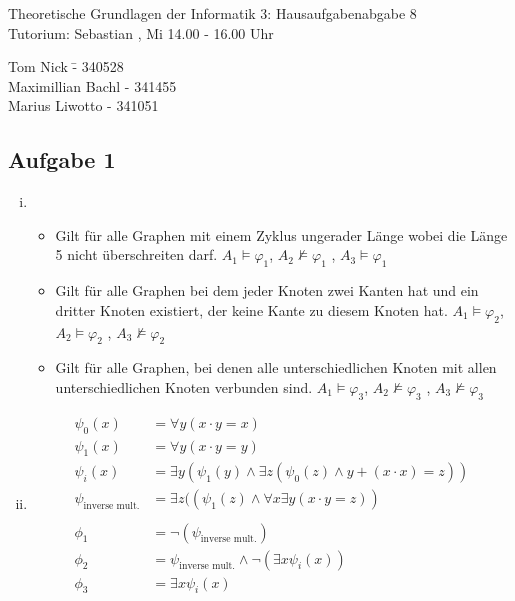 \documentclass[a4paper,10pt]{article}
\begin{document}
\begin{center}
\Large{Theoretische Grundlagen der Informatik 3: Hausaufgabenabgabe 8} \\
\large{Tutorium: Sebastian , Mi 14.00 - 16.00 Uhr}
\end{center}
\begin{tabbing}
Tom Nick \hspace{2cm}\= - 340528\\
Maximillian Bachl \> - 341455 \\
Marius Liwotto\> -  341051
\end{tabbing}
\subsection*{Aufgabe 1}
\begin{enumerate}[(i)]
	\item 
	\begin{itemize}
		\item 	Gilt für alle Graphen mit einem Zyklus ungerader Länge wobei die Länge 5 nicht überschreiten darf. $A_1 \vDash \varphi_1$, $A_2 \not \vDash \varphi_1$ , $A_3 \vDash \varphi_1$
		\item 	Gilt für alle Graphen bei dem jeder Knoten zwei Kanten hat und ein dritter Knoten existiert, der keine Kante zu diesem Knoten hat.
			$A_1 \vDash \varphi_2$, $A_2 \vDash \varphi_2$ , $A_3 \not\vDash \varphi_2$
		\item  	Gilt für alle Graphen, bei denen alle unterschiedlichen Knoten mit allen unterschiedlichen Knoten verbunden sind.
			$A_1 \vDash \varphi_3$, $A_2 \not\vDash\varphi_3$ , $A_3 \not\vDash \varphi_3$
	\end{itemize}
	\item 
	\begin{align*}
		\psi_0(x) &= \forall y(x \cdot y = x) \\
		\psi_1(x) &= \forall y(x \cdot y = y) \\
		\psi_i(x) &= \exists y(\psi_1(y) \land \exists z(\psi_0(z) \land y + (x \cdot x) = z)) \\
		\psi_{\text{inverse mult.}} &=\exists z((\psi_1(z)  \land \forall x \exists y (x \cdot y = z)) \\
		&\\
		\phi_1 &= \lnot(\psi_{\text{inverse mult.}}) \\
		\phi_2 &= \psi_{\text{inverse mult.}} \land \lnot(\exists x\psi_i(x)) \\
		\phi_3 &= \exists x \psi_i(x)
	\end{align*}

\end{enumerate}
\end{document}
